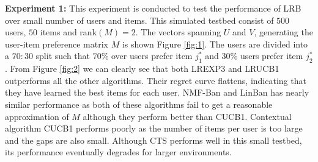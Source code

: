 \textbf{Experiment 1:} This experiment is conducted to test the performance of LRB over  small number of users and items. This simulated testbed consist of $500$ users, $50$ items and rank$(M) = 2$. The vectors spanning $U$ and $V$, generating the user-item preference matrix $M$ is shown Figure \ref{fig:1}. The users are divided into a $70:30$ split such that $70\%$ over users prefer item $j^*_1$ and $30\%$ users prefer item  $j^*_2$. From Figure \ref{fig:2} we can clearly see that both LREXP3 and LRUCB1 outperforms all the other algorithms. Their regret curve flattens, indicating that they have learned the best items for each user.  NMF-Ban and LinBan has nearly similar performance as both of these algorithms fail to get a reasonable approximation of $M$ although they perform better than CUCB1. Contextual algorithm CUCB1 performs poorly as the number of items per user is too large and the gaps are also small. Although CTS performs well in this small testbed, its performance eventually degrades for larger environments. 


